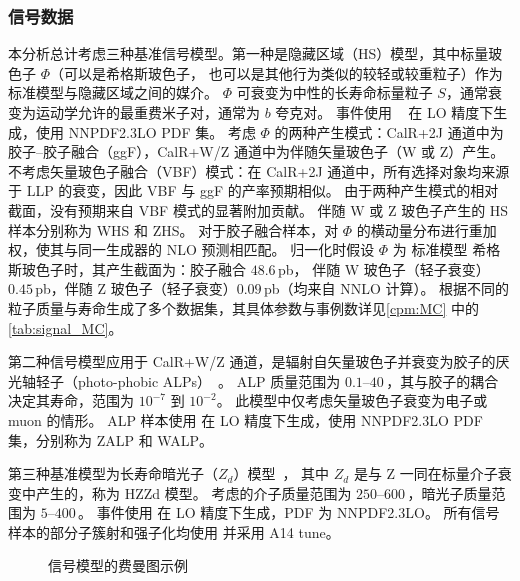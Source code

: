 \subsubsection{信号数据}
本分析总计考虑三种基准信号模型。第一种是隐藏区域（HS）模型，其中标量玻色子 $\Phi$（可以是希格斯玻色子，
也可以是其他行为类似的较轻或较重粒子）作为标准模型与隐藏区域之间的媒介。
$\Phi$ 可衰变为中性的长寿命标量粒子 $S$，通常衰变为运动学允许的最重费米子对，通常为 $b$ 夸克对。
事件使用 ~\cite{Alwall:2014hca} 在 LO 精度下生成，使用 NNPDF2.3LO PDF 集。
考虑 $\Phi$ 的两种产生模式：CalR+2J 通道中为胶子--胶子融合（ggF），CalR+W/Z 通道中为伴随矢量玻色子（W 或 Z）产生。
不考虑矢量玻色子融合（VBF）模式：在 CalR+2J 通道中，所有选择对象均来源于 LLP 的衰变，因此 VBF 与 ggF 的产率预期相似。
由于两种产生模式的相对截面，没有预期来自 VBF 模式的显著附加贡献。
伴随 W 或 Z 玻色子产生的 HS 样本分别称为 WHS 和 ZHS。
对于胶子融合样本，对 $\Phi$ 的横动量分布进行重加权，使其与同一生成器的 NLO 预测相匹配。
归一化时假设 $\Phi$ 为 标准模型 希格斯玻色子时，其产生截面为：胶子融合 $48.6$\,pb，
伴随 W 玻色子（轻子衰变）$0.45$\,pb，伴随 Z 玻色子（轻子衰变）$0.09$\,pb（均来自 NNLO 计算）。
根据不同的粒子质量与寿命生成了多个数据集，其具体参数与事例数详见\autoref{cpm:MC} 中的\autoref{tab:signal_MC}。

第二种信号模型应用于 CalR+W/Z 通道，是辐射自矢量玻色子并衰变为胶子的厌光轴轻子（photo-phobic ALPs）~\cite{Brivio:2017ije}。
ALP 质量范围为 $0.1$--$40$\,\GeV，其与胶子的耦合决定其寿命，范围为 $10^{-7}$ 到 $10^{-2}$。
此模型中仅考虑矢量玻色子衰变为电子或 muon 的情形。
ALP 样本使用  在 LO 精度下生成，使用 NNPDF2.3LO PDF 集，分别称为 ZALP 和 WALP。

第三种基准模型为长寿命暗光子（$Z_d$）模型~\cite{Davoudiasl:2012ag, Davoudiasl:2013aya}，
其中 $Z_d$ 是与 Z 一同在标量介子衰变中产生的，称为 HZZd 模型。
考虑的介子质量范围为 $250$--$600$\,\GeV，暗光子质量范围为 $5$--$400$\,\GeV。
事件使用   在 LO 精度下生成，PDF 为 NNPDF2.3LO。
所有信号样本的部分子簇射和强子化均使用  并采用 A14 tune。

\begin{figure}[ht]
    \centering
    \hfill
    \hfill
    \caption{信号模型的费曼图示例}
    \label{fig:Feynman_diagram}
\end{figure}

